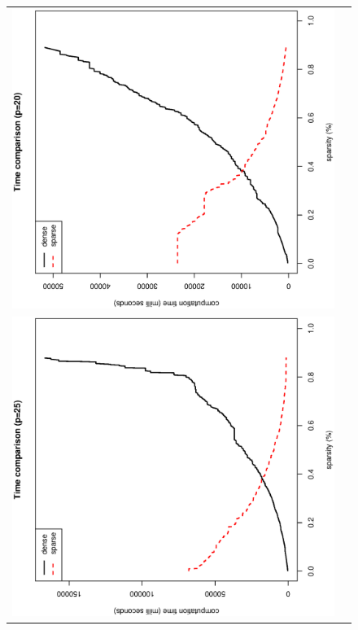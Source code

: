 \documentclass[a4paper]{article}
\begin{document}
\begin{figure}[h!]
\begin{tabular}{ll}
\includegraphics[scale=0.28,angle=270]{timeComparison_p20.ps}
\\
\includegraphics[scale=0.28,angle=270]{timeComparison_p25.ps} &

\end{tabular}
\end{figure}
\end{document}
